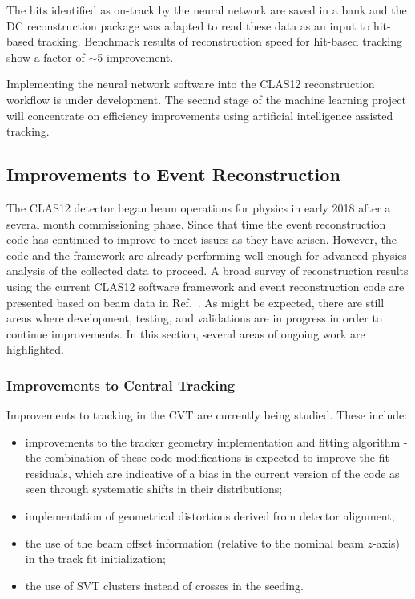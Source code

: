 The hits identified as on-track by the neural network are saved in a bank and the DC reconstruction package was
adapted to read these data as an input to hit-based tracking. Benchmark results of reconstruction speed for
hit-based tracking show a factor of $\sim$5 improvement.

Implementing the neural network software into the CLAS12 reconstruction workflow is under development.
The second stage of the machine learning project will concentrate on efficiency improvements using artificial
intelligence assisted tracking.

\subsection{Improvements to Event Reconstruction}

The CLAS12 detector began beam operations for physics in early 2018 after a several month commissioning
phase. Since that time the event reconstruction code has continued to improve to meet issues as they have
arisen. However, the code and the framework are already performing well enough for advanced physics
analysis of the collected data to proceed. A broad survey of reconstruction results using the current CLAS12
software framework and event reconstruction code are presented based on beam data in Ref.~\cite{clas12-nim}.
As might be expected, there are still areas where development, testing, and validations are in progress in
order to continue improvements. In this section, several areas of ongoing work are highlighted.

\subsubsection{Improvements to Central Tracking}

Improvements to tracking in the CVT are currently being studied. These include:

\begin{itemize}
\item improvements to the tracker geometry implementation and fitting algorithm - the combination of these
  code modifications is expected to improve the fit residuals, which are indicative of a bias in the current
  version of the code as seen through systematic shifts in their distributions;
\item implementation of geometrical distortions derived from detector alignment;
\item the use of the beam offset information (relative to the nominal beam $z$-axis) in the track fit initialization;
\item the use of SVT clusters instead of crosses in the seeding.
\end{itemize}

